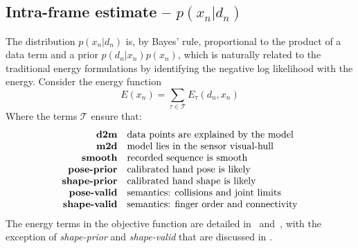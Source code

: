 \subsection{Intra-frame estimate -- $p(x_n|d_n)$}
\label{sec:independent}
\label{sec:intra}
The distribution $p(x_n|d_n)$ is, by Bayes' rule, proportional to the product of a data term and a prior $p(d_n|x_n)p(x_n)$, which is naturally related to the traditional energy formulations by identifying the negative log likelihood with the energy.  Consider the energy function
% 
\begin{equation}
E(x_n) = \sum_{\tau \in \mathcal{T}} E_{\tau}(d_n, x_n) 
\label{eq:energies}
\end{equation}
% 
Where the terms $\mathcal{T}$ ensure that:
%
\begin{equation*}
\setlength{\jot}{0pt}
\begin{aligned}
\text{\textbf{d2m}} & \quad \text{data points are explained by the model} \\ 
\text{\textbf{m2d}} & \quad \text{model lies in the sensor visual-hull} \\
\text{\textbf{smooth}} & \quad \text{recorded sequence is smooth} \\
\text{\textbf{pose-prior}} & \quad \text{calibrated hand pose is likely} \\
\text{\textbf{shape-prior}} & \quad \text{calibrated hand shape is likely} \\
\text{\textbf{pose-valid}} & \quad \text{semantics: collisions and joint limits} \\
\text{\textbf{shape-valid}} & \quad \text{semantics: finger order and connectivity}
\end{aligned}
\end{equation*}
The energy terms in the objective function are detailed in~\cite{tkach2016sphere} and~\cite{htrack}, with the exception of \emph{shape-prior} and \emph{shape-valid} that are discussed in .


